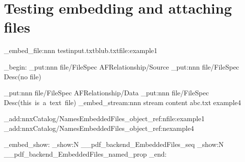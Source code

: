 \documentclass{article}
\begin{document}
\section{Testing embedding and attaching files}
\ExplSyntaxOn
\pdffile_embed_file:nnn {testinput.txt}{blub.txt}{file:example1}



\group_begin:
\pdfdict_put:nnn  {file/FileSpec} {AFRelationship}{/Source}
\pdfdict_put:nnn  {file/FileSpec} {Desc}{(no file)}

\pdfdict_put:nnn  {file/FileSpec} {AFRelationship}{/Data}
\pdfdict_put:nnn  {file/FileSpec} {Desc}{(this~is~a~text~file)}
\pdffile_embed_stream:nnn {stream content} {abc.txt} {example4}



\pdfmanagement_add:nnx{Catalog/Names}{EmbeddedFiles}{\pdf_object_ref:n{file:example1}}
\pdfmanagement_add:nnx{Catalog/Names}{EmbeddedFiles}{\pdf_object_ref:n{example4}}

\pdffile_embed_show:
\seq_show:N  \g__pdf_backend_EmbeddedFiles_seq
\prop_show:N \g__pdf_backend_EmbeddedFiles_named_prop
\group_end:
\end{document}
